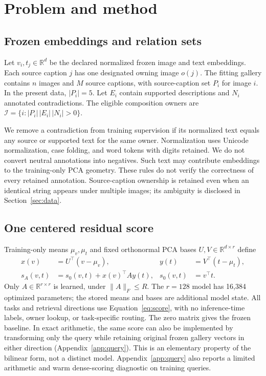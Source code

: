 \documentclass[11pt]{article}
\newcommand{\norm}[1]{\lVert #1\rVert}
\newcommand{\R}{\mathbb R}
\begin{document}
\section{Problem and method}
\subsection{Frozen embeddings and relation sets}
Let $v_i,t_j\in\R^d$ be the declared normalized frozen image and text
embeddings. Each source caption $j$ has one designated owning image $o(j)$.
The fitting gallery contains $n$ images and $M$ source captions, with
source-caption set $P_i$ for image $i$. In the present data, $|P_i|=5$.
Let $E_i$ contain supported descriptions and $N_i$ annotated contradictions.
The eligible composition owners are
$\mathcal I=\{i:|P_i|\,|E_i|\,|N_i|>0\}$.

We remove a contradiction from training supervision if its normalized
text equals any source or supported text for the same owner. Normalization
uses Unicode normalization, case folding, and word tokens with digits
retained. We do not convert neutral annotations into negatives. Such text
may contribute embeddings to the training-only PCA geometry. These rules
do not verify the correctness of every retained annotation.
Source-caption ownership is retained even when an identical string appears
under multiple images; its ambiguity is disclosed in Section~\ref{sec:data}.

\subsection{One centered residual score}
Training-only means $\mu_v,\mu_t$ and fixed orthonormal PCA bases
$U,V\in\R^{d\times r}$ define
\begin{align}
 x(v)&=U^\top(v-\mu_v),&y(t)&=V^\top(t-\mu_t),\\
 s_A(v,t)&=s_0(v,t)+x(v)^\top A y(t),&s_0(v,t)&=v^\top t.
 \label{eq:score}
\end{align}
Only $A\in\R^{r\times r}$ is learned, under $\norm{A}_F\le R$.
The $r=128$ model has 16,384 optimized parameters; the stored means and
bases are additional model state. All tasks and retrieval directions use
Equation~\eqref{eq:score}, with no inference-time labels, owner lookup, or
task-specific routing. The zero matrix gives the frozen baseline.
In exact arithmetic, the same score can also be implemented by transforming
only the query while retaining original frozen gallery vectors in either
direction (Appendix~\ref{app:query}). This is an elementary property of the
bilinear form, not a distinct model. Appendix~\ref{app:query} also reports
a limited arithmetic and warm dense-scoring diagnostic on training queries.
\end{document}
